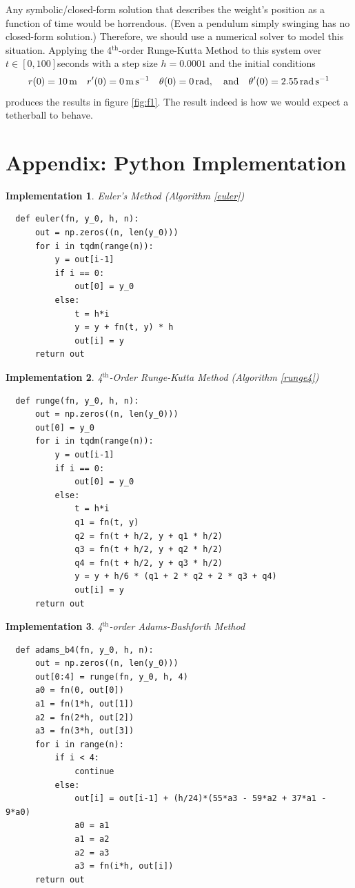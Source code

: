 \documentclass{article}
\newtheorem{implementation}{Implementation}[section]
\newcommand{\0}{\vb{0}}
\begin{document}
Any symbolic/closed-form solution that describes the weight's position as a function of time would be horrendous. (Even a pendulum simply swinging has no closed-form solution.) Therefore, we should use a numerical solver to model this situation. Applying the 4$^\mathrm{th}$-order Runge-Kutta Method to this system over $t \in [0, 100]$seconds with a step size $h = 0.0001$ and the initial conditions 
\[r(0) = \SI{10}{\meter} \quad r'(0) = \SI{0}{\meter\per\second} \quad \theta(0) = \SI{0}{\radian}, \qq{and} \theta'(0) = \SI{2.55}{\radian\per\second}\]
produces the results in figure \ref{fig:f1}. The result indeed is how we would expect a tetherball to behave.

\section*{Appendix: Python Implementation}

\begin{implementation}{Euler's Method (Algorithm \ref{euler})}
  \begin{verbatim}
  def euler(fn, y_0, h, n):
      out = np.zeros((n, len(y_0)))
      for i in tqdm(range(n)):
          y = out[i-1]
          if i == 0:
              out[0] = y_0
          else:
              t = h*i
              y = y + fn(t, y) * h
              out[i] = y
      return out
  \end{verbatim}
\end{implementation}

\begin{implementation}{4$^\mathrm{th}$-Order Runge-Kutta Method (Algorithm \ref{runge4})}
  \begin{verbatim}
  def runge(fn, y_0, h, n):
      out = np.zeros((n, len(y_0)))
      out[0] = y_0
      for i in tqdm(range(n)):
          y = out[i-1]
          if i == 0:
              out[0] = y_0
          else:
              t = h*i
              q1 = fn(t, y)
              q2 = fn(t + h/2, y + q1 * h/2)
              q3 = fn(t + h/2, y + q2 * h/2)
              q4 = fn(t + h/2, y + q3 * h/2)
              y = y + h/6 * (q1 + 2 * q2 + 2 * q3 + q4)
              out[i] = y
      return out
  \end{verbatim}
\end{implementation}

\begin{implementation}{4$^\mathrm{th}$-order Adams-Bashforth Method}
  \begin{verbatim}
  def adams_b4(fn, y_0, h, n):
      out = np.zeros((n, len(y_0)))
      out[0:4] = runge(fn, y_0, h, 4)
      a0 = fn(0, out[0])
      a1 = fn(1*h, out[1])
      a2 = fn(2*h, out[2])
      a3 = fn(3*h, out[3])
      for i in range(n):
          if i < 4:
              continue
          else:
              out[i] = out[i-1] + (h/24)*(55*a3 - 59*a2 + 37*a1 - 9*a0)
              a0 = a1
              a1 = a2
              a2 = a3
              a3 = fn(i*h, out[i])
      return out
  \end{verbatim}
\end{implementation}
\end{document}
